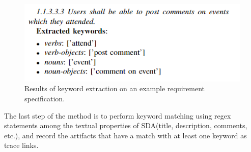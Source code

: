 \begin{figure}[htb]
    \centering
    \includegraphics[width=1\linewidth]{figs/keywords.png}
    \caption{Results of keyword extraction on an example requirement specification.}
    \label{fig:keywords}
\end{figure}

The last step of the method is to perform keyword matching using regex statements among the textual properties of SDA(title, description, comments, etc.), and record the artifacts that have a match with at least one keyword as trace links.\\



